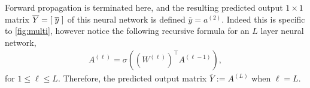 Forward propagation is terminated here, and the resulting predicted output $1 \times 1$ matrix $\overline{Y}=[\hspace{1mm}\overline{y}\hspace{1mm}]$ of this neural network is defined $\overline{y}=a^{(2)}$. Indeed this is specific to \autoref{fig:multi}, however notice the following recursive formula for an $L$ layer neural network,
\begin{align*}
    A^{(\ell)}=\sigma\left((W^{(\ell)})^\top A^{(\ell-1)}\right),
\end{align*}
for $1\leq \ell\leq L$. Therefore, the predicted output matrix $\overline{Y}:=A^{(L)}$ when $\ell=L$.